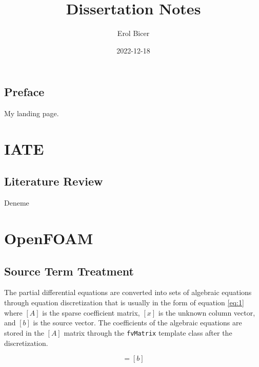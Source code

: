 \documentclass[
]{book}
\title{Dissertation Notes}
\author{Erol Bicer}
\date{2022-12-18}
\begin{document}
\maketitle

{
\setcounter{tocdepth}{1}
\tableofcontents
}
\hypertarget{preface}{%
\chapter*{Preface}\label{preface}}

My landing page.

\hypertarget{part-iate}{%
\part*{IATE}\label{part-iate}}

\hypertarget{literature-review}{%
\chapter*{Literature Review}\label{literature-review}}

Deneme

\hypertarget{part-openfoam}{%
\part*{OpenFOAM}\label{part-openfoam}}

\hypertarget{source-term-treatment}{%
\chapter*{Source Term Treatment}\label{source-term-treatment}}

The partial differential equations are converted into sets of algebraic equations through equation discretization that is usually in the form of equation \eqref{eq:1} where \([A]\) is the sparse coefficient matrix, \([x]\) is the unknown column vector, and \([b]\) is the source vector. The coefficients of the algebraic equations are stored in the \([A]\) matrix through the \texttt{fvMatrix} template class after the discretization.

\begin{equation} 
  [A][x]=[b]
  \label{eq:1}
\end{equation}
\end{document}
